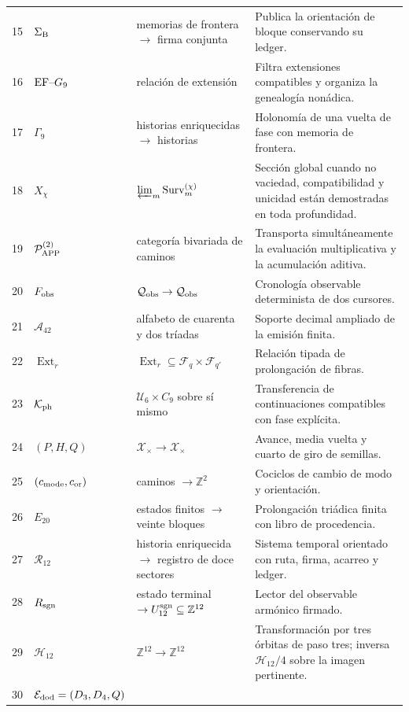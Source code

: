 \begin{longtable}{@{}r p{}p{}p{}@{}}
15&\(\Sigma_{\rm B}\)&memorias de frontera \(\to\) firma conjunta&
Publica la orientación de bloque conservando su ledger.\\
16&\({\rm EF}\text{--}G_9\)&relación de extensión&
Filtra extensiones compatibles y organiza la genealogía nonádica.\\
17&\(\Gamma_9\)&historias enriquecidas \(\longrightarrow\) historias&
Holonomía de una vuelta de fase con memoria de frontera.\\
18&\(X_\chi\)&\(\varprojlim_m\operatorname{Surv}^{(\chi)}_m\)&
Sección global cuando no vaciedad, compatibilidad y unicidad están
demostradas en toda profundidad.\\
19&\(\mathcal P_{\rm APP}^{(2)}\)&categoría bivariada de caminos&
Transporta simultáneamente la evaluación multiplicativa y la acumulación
aditiva.\\
20&\(F_{\rm obs}\)&\(\mathcal Q_{\rm obs}\to\mathcal Q_{\rm obs}\)&
Cronología observable determinista de dos cursores.\\
21&\(\mathcal A_{42}\)&alfabeto de cuarenta y dos tríadas&
Soporte decimal ampliado de la emisión finita.\\
22&\(\operatorname{Ext}_r\)&
\(\operatorname{Ext}_r\subseteq\mathcal F_q\times\mathcal F_{q'}\)&
Relación tipada de prolongación de fibras.\\
23&\(\mathcal K_{\rm ph}\)&\(\mathcal U_6\times C_9\) sobre sí mismo&
Transferencia de continuaciones compatibles con fase explícita.\\
24&\((P,H,Q)\)&\(\mathcal X_\times\to\mathcal X_\times\)&
Avance, media vuelta y cuarto de giro de semillas.\\
25&\((c_{\rm mode},c_{\rm or})\)&caminos \(\to\mathbb Z^2\)&
Cociclos de cambio de modo y orientación.\\
26&\(E_{20}\)&estados finitos \(\to\) veinte bloques&
Prolongación triádica finita con libro de procedencia.\\
27&\(\mathcal R_{12}\)&historia enriquecida \(\to\) registro de doce
sectores&
Sistema temporal orientado con ruta, firma, acarreo y ledger.\\
28&\(R_{\rm sgn}\)&estado terminal \(\to U_{12}^{\rm sgn}
\subseteq\mathbb Z^{12}\)&
Lector del observable armónico firmado.\\
29&\(\mathcal H_{12}\)&\(\mathbb Z^{12}\to\mathbb Z^{12}\)&
Transformación por tres órbitas de paso tres; inversa
\(\mathcal H_{12}/4\) sobre la imagen pertinente.\\
30&\(\mathcal E_{\rm dod}=(D_3,D_4,Q)\)&

\end{longtable}
